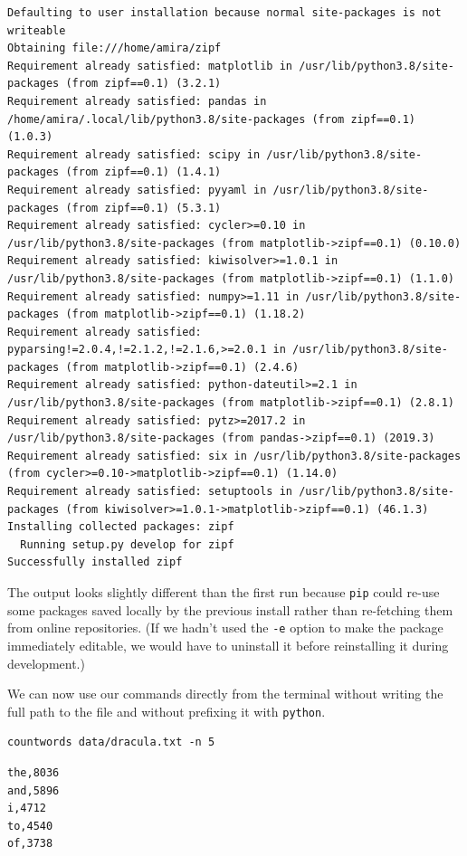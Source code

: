\documentclass[
]{krantz}
\begin{document}
\begin{verbatim}
Defaulting to user installation because normal site-packages is not writeable
Obtaining file:///home/amira/zipf
Requirement already satisfied: matplotlib in /usr/lib/python3.8/site-packages (from zipf==0.1) (3.2.1)
Requirement already satisfied: pandas in /home/amira/.local/lib/python3.8/site-packages (from zipf==0.1) (1.0.3)
Requirement already satisfied: scipy in /usr/lib/python3.8/site-packages (from zipf==0.1) (1.4.1)
Requirement already satisfied: pyyaml in /usr/lib/python3.8/site-packages (from zipf==0.1) (5.3.1)
Requirement already satisfied: cycler>=0.10 in /usr/lib/python3.8/site-packages (from matplotlib->zipf==0.1) (0.10.0)
Requirement already satisfied: kiwisolver>=1.0.1 in /usr/lib/python3.8/site-packages (from matplotlib->zipf==0.1) (1.1.0)
Requirement already satisfied: numpy>=1.11 in /usr/lib/python3.8/site-packages (from matplotlib->zipf==0.1) (1.18.2)
Requirement already satisfied: pyparsing!=2.0.4,!=2.1.2,!=2.1.6,>=2.0.1 in /usr/lib/python3.8/site-packages (from matplotlib->zipf==0.1) (2.4.6)
Requirement already satisfied: python-dateutil>=2.1 in /usr/lib/python3.8/site-packages (from matplotlib->zipf==0.1) (2.8.1)
Requirement already satisfied: pytz>=2017.2 in /usr/lib/python3.8/site-packages (from pandas->zipf==0.1) (2019.3)
Requirement already satisfied: six in /usr/lib/python3.8/site-packages (from cycler>=0.10->matplotlib->zipf==0.1) (1.14.0)
Requirement already satisfied: setuptools in /usr/lib/python3.8/site-packages (from kiwisolver>=1.0.1->matplotlib->zipf==0.1) (46.1.3)
Installing collected packages: zipf
  Running setup.py develop for zipf
Successfully installed zipf
\end{verbatim}

The output looks slightly different than the first run
because \texttt{pip} could re-use some packages saved locally by the previous install
rather than re-fetching them from online repositories.
(If we hadn't used the \texttt{-e} option to make the package immediately editable,
we would have to uninstall it before reinstalling it during development.)

We can now use our commands directly from the terminal
without writing the full path to the file
and without prefixing it with \texttt{python}.

\begin{verbatim}
countwords data/dracula.txt -n 5
\end{verbatim}

\begin{verbatim}
the,8036
and,5896
i,4712
to,4540
of,3738
\end{verbatim}
\end{document}

